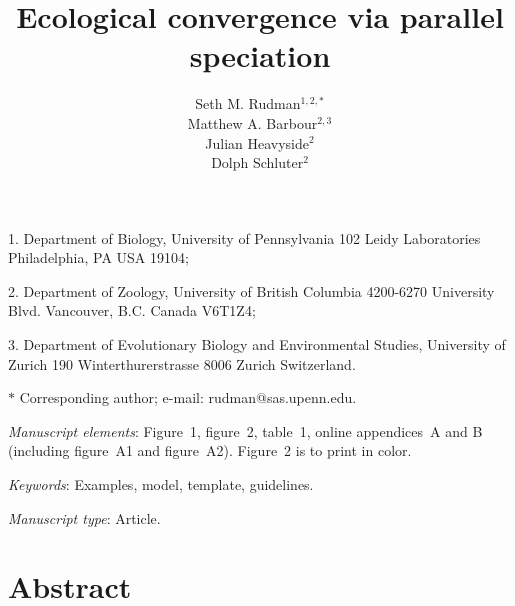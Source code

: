 \documentclass[11pt]{article}
\title{Ecological convergence via parallel speciation}
\author{Seth M. Rudman$^{1,2,\ast}$ \\ 
Matthew A. Barbour$^{2,3}$ \\ 
Julian Heavyside$^{2}$ \\
Dolph Schluter$^{2}$}
\date{}
\begin{document}
\maketitle

\noindent{}1. Department of Biology, University of Pennsylvania 102 Leidy Laboratories Philadelphia, PA USA 19104;

\noindent{}2. Department of Zoology, University of British Columbia 4200-6270 University Blvd. Vancouver, B.C. Canada V6T1Z4;

\noindent{}3. Department of Evolutionary Biology and Environmental Studies, University of Zurich 190 Winterthurerstrasse 8006 Zurich Switzerland.

\noindent{}$\ast$ Corresponding author; e-mail: rudman@sas.upenn.edu.


\bigskip

\textit{Manuscript elements}: Figure~1, figure~2, table~1, online
appendices~A and B (including figure~A1 and figure~A2). Figure~2 is to
print in color.

\bigskip

\textit{Keywords}: Examples, model, template, guidelines.

\bigskip

\textit{Manuscript type}: Article. 

\bigskip


\linenumbers{}
\modulolinenumbers[3]

\newpage{}

\section*{Abstract}
\end{document}
